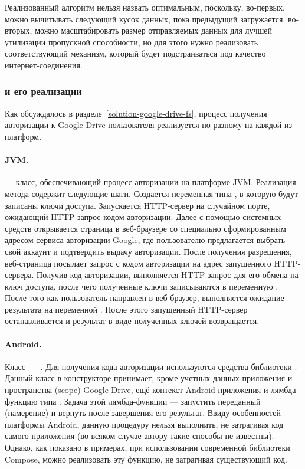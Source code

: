     Реализованный алгоритм нельзя назвать оптимальным, поскольку, во-первых, можно вычитывать следующий кусок данных, пока предыдущий загружается, во-вторых, можно масштабировать размер отправляемых данных для лучшей утилизации пропускной способности, но для этого нужно реализовать соответствующий механизм, который будет подстраиваться под качество интернет-соединения.

  \subsubsection{ и его реализации}\label{solution-details-gdrive-auth-req}
    Как обсуждалось в разделе~\ref{solution-google-drive-fs}, процесс получения авторизации к Google Drive пользователя реализуется по-разному на каждой из платформ.

    \sloppy
    \paragraph{JVM.}  --- класс, обеспечивающий процесс авторизации на платформе JVM. Реализация метода  содержит следующие шаги. Создается переменная  типа , в которую будут записаны ключи доступа. Запускается HTTP-сервер на случайном порте, ожидающий HTTP-запрос кодом авторизации. Далее с помощью системных средств открывается страница в веб-браузере со специально сформированным адресом сервиса авторизации Google, где пользователю предлагается выбрать свой аккаунт и подтвердить выдачу авторизации. После получения разрешения, веб-страница посылает запрос с кодом авторизации на адрес запущенного HTTP-сервера. Получив код авторизации, выполняется HTTP-запрос для его обмена на ключ доступа, после чего полученные ключи записываются в переменную . После того как пользователь направлен в веб-браузер, выполняется ожидание результата на переменной . После этого запущенный HTTP-сервер останавливается и результат в виде полученных ключей возвращается.

    \fussy

    \paragraph{Android.} Класс~--- . Для получения кода авторизации используются средства библиотеки . Данный класс в конструкторе принимает, кроме учетных данных приложения и пространства (scope) Google Drive, ещё контекст Android-приложения и лямбда-функцию типа . Задача этой лямбда-функции --- запустить переданный  (намерение) и вернуть после завершения его результат. Ввиду особенностей платформы Android, данную процедуру нельзя выполнить, не затрагивая код самого приложения (во всяком случае автору такие способы не известны). Однако, как показано в примерах, при использовании современной библиотеки Compose, можно реализовать эту функцию, не затрагивая существующий код.

